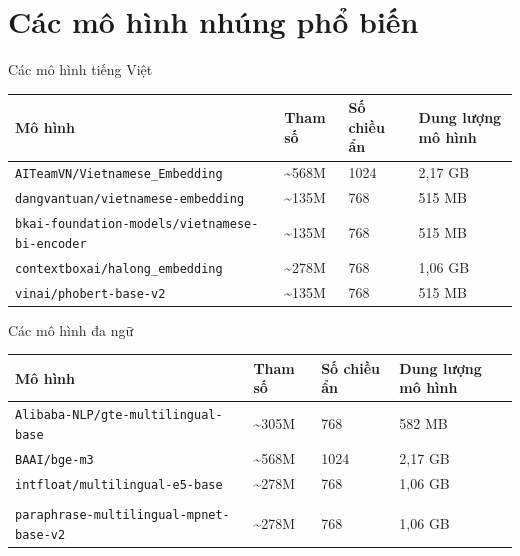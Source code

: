 \documentclass[aspectratio=169,10pt]{beamer}
\begin{document}
\section{Các mô hình nhúng phổ biến}
\begin{frame}{Các mô hình tiếng Việt}
    \scriptsize
    \renewcommand{\arraystretch}{1.55}
    \begin{tabular}{@{}p{}p{}p{}p{}@{}}
        \textbf{Mô hình}                                      & \textbf{Tham số}    & \textbf{Số chiều ẩn} & \textbf{Dung lượng mô hình} \\
        \midrule
        \texttt{AITeamVN/Vietnamese\_Embedding}               & \textasciitilde568M & 1024                 & 2{,}17 GB                   \\
        \texttt{dangvantuan/vietnamese-embedding}             & \textasciitilde135M & 768                  & 515 MB                      \\
        \texttt{bkai-foundation-models/vietnamese-bi-encoder} & \textasciitilde135M & 768                  & 515 MB                      \\
        \texttt{contextboxai/halong\_embedding}               & \textasciitilde278M & 768                  & 1{,}06 GB                   \\
        \texttt{vinai/phobert-base-v2}                        & \textasciitilde135M & 768                  & 515 MB                      \\
        \bottomrule
    \end{tabular}
\end{frame}

\begin{frame}{Các mô hình đa ngữ}
    \scriptsize
    \renewcommand{\arraystretch}{1.55}
    \begin{tabular}{@{}p{}p{}p{}p{}@{}}
        \textbf{Mô hình}                           & \textbf{Tham số}    & \textbf{Số chiều ẩn} & \textbf{Dung lượng mô hình} \\
        \midrule
        \texttt{Alibaba-NLP/gte-multilingual-base} & \textasciitilde305M & 768                  & 582 MB                      \\
        \texttt{BAAI/bge-m3}                       & \textasciitilde568M & 1024                 & 2{,}17 GB                   \\
        \texttt{intfloat/multilingual-e5-base}     & \textasciitilde278M & 768                  & 1{,}06 GB                   \\
        \shortstack[l]{\texttt{sentence-transformers/}                                                                        \\\texttt{paraphrase-multilingual-mpnet-base-v2}} & \textasciitilde278M & 768 & 1{,}06 GB\\
        \bottomrule
    \end{tabular}
\end{frame}
\end{document}
